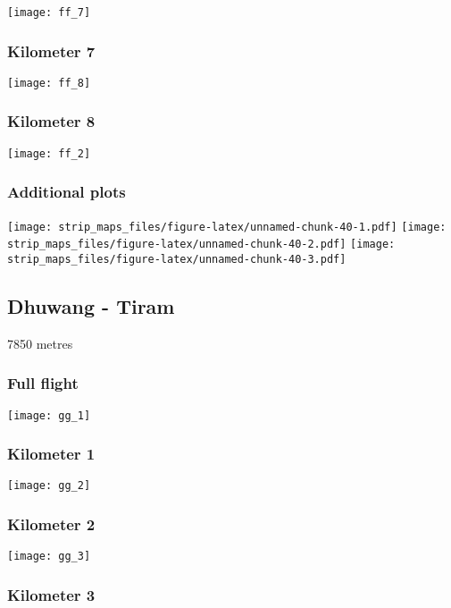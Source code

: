 \documentclass[]{article}
\begin{document}
\texttt{[image: ff\_7]}

\subsubsection{Kilometer 7}\label{kilometer-7-15}

\texttt{[image: ff\_8]}

\subsubsection{Kilometer 8}\label{kilometer-8-10}

\texttt{[image: ff\_2]}

\subsubsection{Additional plots}\label{additional-plots-31}

\texttt{[image: strip\_maps\_files/figure-latex/unnamed-chunk-40-1.pdf]}
\texttt{[image: strip\_maps\_files/figure-latex/unnamed-chunk-40-2.pdf]}
\texttt{[image: strip\_maps\_files/figure-latex/unnamed-chunk-40-3.pdf]}

\newpage

\subsection{Dhuwang - Tiram}\label{dhuwang---tiram}

7850 metres

\subsubsection{Full flight}\label{full-flight-32}

\texttt{[image: gg\_1]}

\subsubsection{Kilometer 1}\label{kilometer-1-32}

\texttt{[image: gg\_2]}

\subsubsection{Kilometer 2}\label{kilometer-2-32}

\texttt{[image: gg\_3]}

\subsubsection{Kilometer 3}\label{kilometer-3-32}
\end{document}
